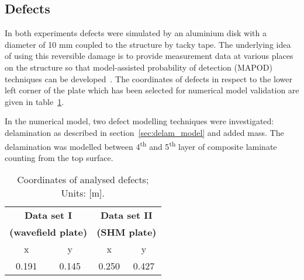 \documentclass[preprint,12pt]{elsarticle}
\begin{document}
	\subsection{Defects}
	In both experiments defects were simulated by an aluminium disk with a diameter of 10 mm coupled to the structure by tacky tape. The underlying idea of using this reversible damage is to provide measurement data at various places on the structure so that model-assisted probability of detection (MAPOD) techniques can be developed~\cite{Eckstein2012}. The coordinates of defects in respect to the lower left corner of the plate which has been selected for numerical model validation are given in table~\ref{tab:defect_coordinates}.
	
	In the numerical model, two defect modelling techniques were investigated: delamination as described in section~\ref{sec:delam_model} and added mass. The delamination was modelled between 4\textsuperscript{th} and 5\textsuperscript{th} layer of composite laminate counting from the top surface.
	\begin{table}
		\renewcommand{\arraystretch}{1.3}
		\centering \footnotesize
		\caption{Coordinates of analysed defects; Units: [m].}
		\begin{tabular}{cccc} 
			\toprule
			\multicolumn{2}{c}{\textbf{Data set I} }	& \multicolumn{2}{c}{\textbf{Data set II} } \\
			\multicolumn{2}{c}{\textbf{(wavefield plate)} }	& \multicolumn{2}{c}{\textbf{(SHM plate)} } \\
			\cmidrule(lr){1-2} \cmidrule(lr){3-4}
			x & y &  x &  y  \\
			0.191 & 0.145 & 0.250  & 0.427 \\ 
			\bottomrule 
		\end{tabular} 
		\label{tab:defect_coordinates}
	\end{table}		
\end{document}
